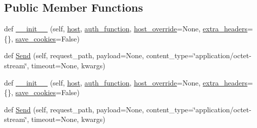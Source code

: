 \subsection*{Public Member Functions}
\begin{DoxyCompactItemize}
\item 
def \hyperlink{classupload_1_1_abstract_rpc_server_a3f6bc1bd16b52bd5a5c33a1fedeef2d0}{\+\_\+\+\_\+init\+\_\+\+\_\+} (self, \hyperlink{classupload_1_1_abstract_rpc_server_ab7188d827e2faddcf970f524f5856192}{host}, \hyperlink{classupload_1_1_abstract_rpc_server_aee0090a3bcf07b913a7dd596a5dabb8f}{auth\+\_\+function}, \hyperlink{classupload_1_1_abstract_rpc_server_a783a4a7e4ffb776a57a3f267300a213b}{host\+\_\+override}=None, \hyperlink{classupload_1_1_abstract_rpc_server_adbbf0109afc13d58d7815fa143cb779f}{extra\+\_\+headers}=\{\}, \hyperlink{classupload_1_1_abstract_rpc_server_affe342205c4647d41b127f5a5634858b}{save\+\_\+cookies}=False)
\item 
def \hyperlink{classupload_1_1_abstract_rpc_server_ac1b913f8bd00da4741c47ab49ea94cb5}{Send} (self, request\+\_\+path, payload=None, content\+\_\+type=\char`\"{}application/octet-\/stream\char`\"{}, timeout=None, kwargs)
\item 
def \hyperlink{classupload_1_1_abstract_rpc_server_a3f6bc1bd16b52bd5a5c33a1fedeef2d0}{\+\_\+\+\_\+init\+\_\+\+\_\+} (self, \hyperlink{classupload_1_1_abstract_rpc_server_ab7188d827e2faddcf970f524f5856192}{host}, \hyperlink{classupload_1_1_abstract_rpc_server_aee0090a3bcf07b913a7dd596a5dabb8f}{auth\+\_\+function}, \hyperlink{classupload_1_1_abstract_rpc_server_a783a4a7e4ffb776a57a3f267300a213b}{host\+\_\+override}=None, \hyperlink{classupload_1_1_abstract_rpc_server_adbbf0109afc13d58d7815fa143cb779f}{extra\+\_\+headers}=\{\}, \hyperlink{classupload_1_1_abstract_rpc_server_affe342205c4647d41b127f5a5634858b}{save\+\_\+cookies}=False)
\item 
def \hyperlink{classupload_1_1_abstract_rpc_server_ac1b913f8bd00da4741c47ab49ea94cb5}{Send} (self, request\+\_\+path, payload=None, content\+\_\+type=\char`\"{}application/octet-\/stream\char`\"{}, timeout=None, kwargs)
\end{DoxyCompactItemize}
